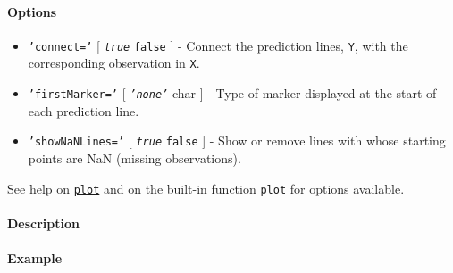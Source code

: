 \paragraph{Options}\label{options}

\begin{itemize}
\item
  \texttt{'connect='} {[} \emph{\texttt{true}} \textbar{} \texttt{false}
  {]} - Connect the prediction lines, \texttt{Y}, with the corresponding
  observation in \texttt{X}.
\item
  \texttt{'firstMarker='} {[} \emph{\texttt{'none'}} \textbar{} char {]}
  - Type of marker displayed at the start of each prediction line.
\item
  \texttt{'showNaNLines='} {[} \emph{\texttt{true}} \textbar{}
  \texttt{false} {]} - Show or remove lines with whose starting points
  are NaN (missing observations).
\end{itemize}

See help on \href{tseries/plot}{\texttt{plot}} and on the built-in
function \texttt{plot} for options available.

\paragraph{Description}\label{description}

\paragraph{Example}\label{example}


